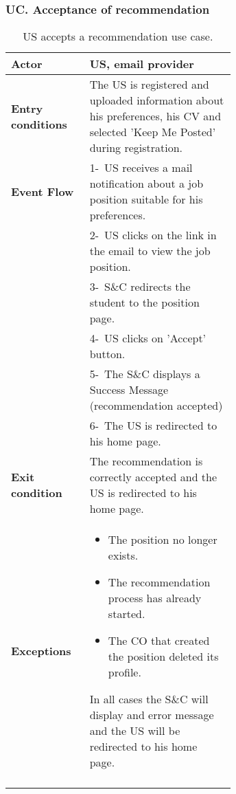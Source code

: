 \subsubsection*{UC\cuc . Acceptance of recommendation}
\begin{center}
    \begin{longtable}{|l|p{0.65\linewidth}|}
        \hline
        \textbf{Actor}            & US, email provider \\
        \hline
        \textbf{Entry conditions} & The US is registered and uploaded information about his preferences, his CV and selected 'Keep Me Posted' during registration. \\
        \hline
        \textbf{Event Flow}       & 1-\  US receives a mail notification about a job position suitable for his preferences. \\
        & 2-\ US clicks on the link in the email to view the job position.\\
        & 3-\ S\&C redirects the student to the position page.\\
        & 4-\ US clicks on 'Accept' button.\\
        & 5-\ The S\&C displays a Success Message (recommendation accepted)\\
        & 6-\ The US is redirected to his home page.\\
        \hline
        \textbf{Exit condition}   &  The recommendation is correctly accepted and the US is redirected to his home page. \\
        \hline
        \textbf{Exceptions}       & \begin{itemize}
            \item The position no longer exists.
            \item The recommendation process has already started.
            \item The CO that created the position deleted its profile.
        \end{itemize} In all cases the S\&C will display and error message and the US will be redirected to his home page. \\
        \hline
        \caption{US accepts a recommendation use case.}
        \label{tab: us_recommendation_use_case}
    \end{longtable}
\end{center}

